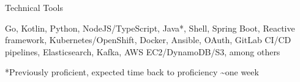 


\begin{cvskills}


\cvskill
{Technical Tools} %
{
    \begin{cvitems}
        \item[] {Go, Kotlin, Python, NodeJS/TypeScript, Java*, Shell, Spring Boot, Reactive framework, Kubernetes/OpenShift, Docker, Ansible, OAuth, GitLab CI/CD pipelines, Elasticsearch, Kafka, AWS EC2/DynamoDB/S3, among others}
        \item[] {\scriptsize{*Previously proficient, expected time back to proficiency \textasciitilde{one} week}}
    \end{cvitems}
}









\end{cvskills}
